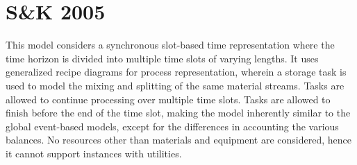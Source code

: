 \section{S\&K 2005}
This model \citep{Karimi} considers a synchronous slot-based time representation where the time horizon is divided into multiple time slots of varying lengths. It uses generalized recipe diagrams for process representation, wherein a storage task is used to model the mixing and splitting of the same material streams. Tasks are allowed to continue processing over multiple time slots. Tasks are allowed to finish before the end of the time slot, making the model inherently similar to the global event-based models, except for the differences in accounting the various balances. No resources other than materials and equipment are considered, hence it cannot support instances with utilities.

